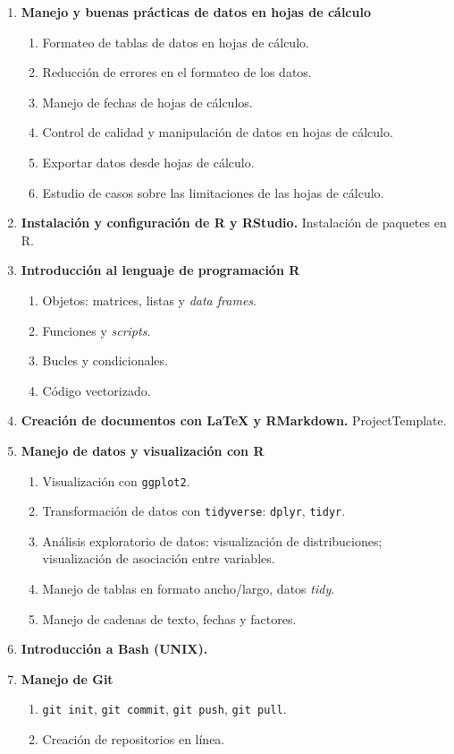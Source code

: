 \begin{refsection}
\begin{enumerate}
\item \textbf{Manejo y buenas prácticas de datos en hojas de cálculo}
\begin{enumerate}
\item Formateo de tablas de datos en hojas de cálculo.
\item Reducción de errores en el formateo de los datos.
\item Manejo de fechas de hojas de cálculos.
\item Control de calidad y manipulación de datos en hojas de cálculo.
\item Exportar datos desde hojas de cálculo.
\item Estudio de casos sobre las limitaciones de las hojas de cálculo.
\end{enumerate}
\item \textbf{Instalación y configuración de R y RStudio.} Instalación de paquetes en R.
\item \textbf{Introducción al lenguaje de programación R}
\begin{enumerate}
\item Objetos: matrices, listas y \emph{data frames}.
\item Funciones y \emph{scripts}.
\item Bucles y condicionales.
\item Código vectorizado.
\end{enumerate}
\item \textbf{Creación de documentos con \LaTeX{} y RMarkdown.} ProjectTemplate.
\item \textbf{Manejo de datos y visualización con R}
\begin{enumerate}
\item Visualización con \texttt{ggplot2}.
\item Transformación de datos con \texttt{tidyverse}: \texttt{dplyr}, \texttt{tidyr}.
\item Análisis exploratorio de datos: visualización de distribuciones; visualización de asociación entre variables.
\item Manejo de tablas en formato ancho/largo, datos \emph{tidy}.
\item Manejo de cadenas de texto, fechas y factores.
\end{enumerate}
\item \textbf{Introducción a Bash (UNIX).}
\item \textbf{Manejo de Git}
\begin{enumerate}
\item \texttt{git init}, \texttt{git commit}, \texttt{git push}, \texttt{git pull}.
\item Creación de repositorios en línea.
\end{enumerate}
\end{enumerate}


\end{refsection}
